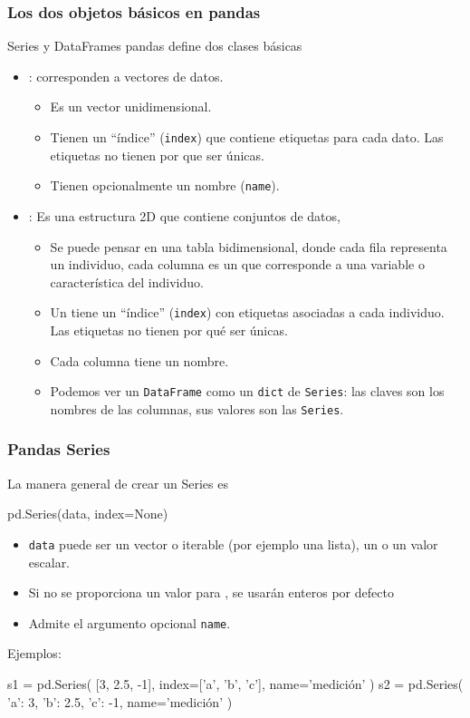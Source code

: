 \documentclass[9pt]{beamer}
\begin{document}
\begin{frame}[fragile]
  \frametitle{Los dos objetos básicos en pandas}
  \begin{block}{Series y DataFrames}
    pandas define dos clases básicas
  \begin{itemize}
  \item {}: corresponden a vectores de datos.
  \begin{itemize}
  \item Es un vector unidimensional.
  \item  Tienen un ``índice'' ({\tt index}) que contiene etiquetas para cada dato. Las etiquetas no tienen por que ser únicas.
  \item Tienen opcionalmente un nombre ({\tt name}).
  \end{itemize}
    \item {}: Es una estructura 2D que contiene conjuntos de datos,
      \begin{itemize}
      \item Se puede pensar en una tabla bidimensional, donde  cada fila representa un individuo, cada columna es un  que corresponde a una variable o característica del individuo.
      \item   Un  tiene un ``índice'' ({\tt index}) con etiquetas asociadas a cada individuo. Las etiquetas no tienen por qué ser únicas.
      \item Cada columna tiene un nombre.
      \item Podemos ver un {\tt DataFrame} como un {\tt dict} de {\tt Series}: las claves son los nombres de las columnas, sus valores son las {\tt Series}.
      \end{itemize}
  \end{itemize}
  \end{block}
\end{frame}
\begin{frame}[fragile]
  \frametitle{Pandas Series}
  La manera general de crear un Series es
  \begin{pyverbatim}
    pd.Series(data, index=None)
  \end{pyverbatim}
  \begin{itemize}
  \item   {\tt data} puede ser un vector o iterable (por ejemplo una lista), un  o un valor escalar.
  \item Si no se proporciona un valor para , se usarán enteros por defecto
  \item Admite el argumento opcional {\tt name}.
  \end{itemize}
  Ejemplos:
  \begin{pyblock}
s1 = pd.Series(
        [3, 2.5, -1],
        index=['a', 'b', 'c'],
        name='medición'
)
s2 = pd.Series(
        {'a': 3, 'b': 2.5, 'c': -1},
        name='medición'
)
  \end{pyblock}
\end{frame}
\end{document}
